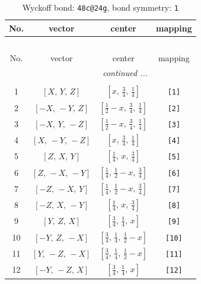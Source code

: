 \documentclass[fleqn,8pt]{jsarticle}
\begin{document}
\begin{longtable}{cccc}
\caption{Wyckoff bond: {\tt 48c@24g}, bond symmetry: {\tt 1}}
 \\
 \hline \hline
No. & vector & center & mapping \\ \hline \endfirsthead

\multicolumn{3}{l}{\tablename\ \thetable{}} \\
 \hline \hline
No. & vector & center & mapping \\ \hline \endhead

 \hline \hline
\multicolumn{3}{r}{\footnotesize\it continued ...} \\ \endfoot

 \hline \hline
\multicolumn{3}{r}{} \\ \endlastfoot

1 & $\left[ X,\, Y,\, Z \right]$ & $\left[ x,\, \frac{3}{4},\, \frac{1}{4} \right]$ & {\tt [1]} \\ \hline
2 & $\left[ - X,\, - Y,\, Z \right]$ & $\left[ \frac{1}{2} - x,\, \frac{3}{4},\, \frac{1}{4} \right]$ & {\tt [2]} \\ \hline
3 & $\left[ - X,\, Y,\, - Z \right]$ & $\left[ \frac{1}{2} - x,\, \frac{3}{4},\, \frac{1}{4} \right]$ & {\tt [3]} \\ \hline
4 & $\left[ X,\, - Y,\, - Z \right]$ & $\left[ x,\, \frac{3}{4},\, \frac{1}{4} \right]$ & {\tt [4]} \\ \hline
5 & $\left[ Z,\, X,\, Y \right]$ & $\left[ \frac{1}{4},\, x,\, \frac{3}{4} \right]$ & {\tt [5]} \\ \hline
6 & $\left[ Z,\, - X,\, - Y \right]$ & $\left[ \frac{1}{4},\, \frac{1}{2} - x,\, \frac{3}{4} \right]$ & {\tt [6]} \\ \hline
7 & $\left[ - Z,\, - X,\, Y \right]$ & $\left[ \frac{1}{4},\, \frac{1}{2} - x,\, \frac{3}{4} \right]$ & {\tt [7]} \\ \hline
8 & $\left[ - Z,\, X,\, - Y \right]$ & $\left[ \frac{1}{4},\, x,\, \frac{3}{4} \right]$ & {\tt [8]} \\ \hline
9 & $\left[ Y,\, Z,\, X \right]$ & $\left[ \frac{3}{4},\, \frac{1}{4},\, x \right]$ & {\tt [9]} \\ \hline
10 & $\left[ - Y,\, Z,\, - X \right]$ & $\left[ \frac{3}{4},\, \frac{1}{4},\, \frac{1}{2} - x \right]$ & {\tt [10]} \\ \hline
11 & $\left[ Y,\, - Z,\, - X \right]$ & $\left[ \frac{3}{4},\, \frac{1}{4},\, \frac{1}{2} - x \right]$ & {\tt [11]} \\ \hline
12 & $\left[ - Y,\, - Z,\, X \right]$ & $\left[ \frac{3}{4},\, \frac{1}{4},\, x \right]$ & {\tt [12]} \\ \hline

\end{longtable}
\end{document}
